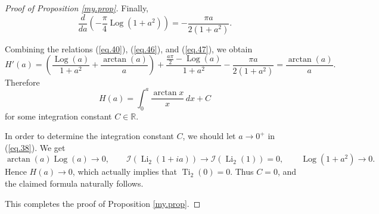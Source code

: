 \documentclass[10pt,a4paper]{amsart}
\begin{document}
\begin{proof}[Proof of Proposition \ref{my.prop}]
Finally,
\begin{equation}\label{eq.47}
\frac{d}{da}\left(-\frac{\pi}{4}\operatorname{Log}(1+a^2)\right)
=
-\frac{\pi a}{2(1+a^2)}.
\end{equation}

Combining the relations (\ref{eq.40}), (\ref{eq.46}), and (\ref{eq.47}), we obtain
\begin{equation}
H'(a)
=
\left(\frac{\operatorname{Log}(a)}{1+a^2}+\frac{\arctan(a)}{a}\right)
+
\frac{\frac{a\pi}{2}-\operatorname{Log}(a)}{1+a^2}
-
\frac{\pi a}{2(1+a^2)}
=
\frac{\arctan(a)}{a}.
\end{equation}
Therefore
\begin{equation}
H(a)=\int_0^a \frac{\arctan x}{x}\,dx + C
\end{equation}
for some integration constant \(C\in\mathbb{R}\).

In order to determine the integration constant \(C\), we should let \(a\to 0^+\) in (\ref{eq.38}). We get
\[
\arctan(a)\operatorname{Log}(a)\to 0,
\qquad
\mathscr{I}(\operatorname{Li}_2(1+ia))\to \mathscr{I}(\operatorname{Li}_2(1))=0,
\qquad
\operatorname{Log}(1+a^2)\to 0.
\]
Hence \(H(a)\to 0\), which actually implies that \(\operatorname{Ti}_2(0)=0\). Thus \(C=0\), and the claimed formula naturally follows.

This completes the proof of Proposition \ref{my.prop}.
\end{proof}
\end{document}
